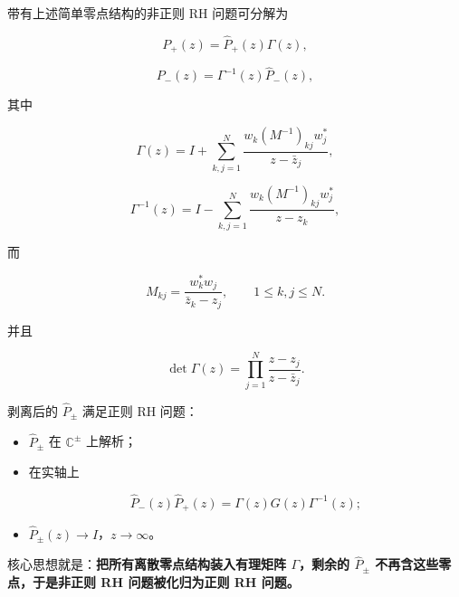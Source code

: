 \documentclass[
    lang=cn,
    scheme=chinese,
    mode=simple,
    device=normal,
    color=blue,
    math=cm,
    thmcnt=section,
    12pt
]{elegantbook}
\begin{document}
\setcounter{theorem}{2}
\begin{theorem}
带有上述简单零点结构的非正则 RH 问题可分解为

\begin{equation}
    P_+(z)
    =
    \widehat P_+(z)\Gamma(z),
    \tag{5.3.14}
    \label{eq:5.3.14}
\end{equation}

\begin{equation}
    P_-(z)
    =
    \Gamma^{-1}(z)\widehat P_-(z),
    \tag{5.3.15}
    \label{eq:5.3.15}
\end{equation}

其中

\begin{equation}
    \Gamma(z)
    =
    I+
    \sum\limits_{k,j=1}^{N}
    \dfrac{
        w_k(M^{-1})_{kj}w_j^*
    }{
        z-\bar z_j
    },
    \tag{5.3.16}
    \label{eq:5.3.16}
\end{equation}

\begin{equation}
    \Gamma^{-1}(z)
    =
    I-
    \sum\limits_{k,j=1}^{N}
    \dfrac{
        w_k(M^{-1})_{kj}w_j^*
    }{
        z-z_k
    },
    \tag{5.3.17}
    \label{eq:5.3.17}
\end{equation}

而

\[
    M_{kj}
    =
    \dfrac{w_k^*w_j}{\bar z_k-z_j},
    \qquad
    1\le k,j\le N.
\]

并且

\[
    \det\Gamma(z)
    =
    \prod\limits_{j=1}^{N}
    \dfrac{z-z_j}{z-\bar z_j}.
\]

剥离后的 $\widehat P_\pm$ 满足正则 RH 问题：

\begin{itemize}
    \item $\widehat P_\pm$ 在 $\mathbb{C}^\pm$ 上解析；
    \item 在实轴上

          \[
              \widehat P_-(z)\widehat P_+(z)
              =
              \Gamma(z)G(z)\Gamma^{-1}(z);
          \]

    \item $\widehat P_\pm(z)\to I$，$z\to\infty$。
\end{itemize}

\end{theorem}

核心思想就是：\textbf{把所有离散零点结构装入有理矩阵 $\Gamma$，剩余的 $\widehat P_\pm$ 不再含这些零点，于是非正则 RH 问题被化归为正则 RH 问题。}
\end{document}
